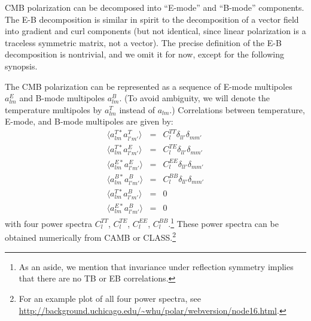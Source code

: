 \documentclass[aps,prd,superscriptaddress,groupedaddress,nofootinbib,nobibnotes]{revtex4}
\newcommand{\ba}{\begin{eqnarray}}
\newcommand{\ea}{\end{eqnarray}}
\begin{document}
CMB polarization can be decomposed into ``E-mode'' and ``B-mode'' components.
The E-B decomposition is similar in spirit to the decomposition of a vector field into gradient and curl 
components (but not identical, since linear polarization is a traceless symmetric matrix, not a vector).
The precise definition of the E-B decomposition is nontrivial, and we omit it for now, except for the following 
synopsis.

The CMB polarization can be represented as a sequence of E-mode multipoles $a_{lm}^E$ and B-mode multipoles $a_{lm}^B$.
(To avoid ambiguity, we will denote the temperature multipoles by $a_{lm}^T$ instead of $a_{lm}$.)
Correlations between temperature, E-mode, and B-mode multipoles are given by:
\ba
\langle a_{lm}^{T*} a_{l'm'}^T \rangle &=& C_l^{TT} \delta_{ll'} \delta_{mm'} \\
\langle a_{lm}^{T*} a_{l'm'}^E \rangle &=& C_l^{TE} \delta_{ll'} \delta_{mm'} \\
\langle a_{lm}^{E*} a_{l'm'}^E \rangle &=& C_l^{EE} \delta_{ll'} \delta_{mm'} \\
\langle a_{lm}^{B*} a_{l'm'}^B \rangle &=& C_l^{BB} \delta_{ll'} \delta_{mm'} \\
\langle a_{lm}^{T*} a_{l'm'}^B \rangle &=& 0  \\
\langle a_{lm}^{E*} a_{l'm'}^B \rangle &=& 0
\ea
with four power spectra $C_l^{TT}$, $C_l^{TE}$, $C_l^{EE}$, $C_l^{BB}$.\footnote{As an aside,
 we mention that invariance under reflection symmetry implies that there are no TB or EB correlations.}
These power spectra can be obtained numerically from CAMB or CLASS.\footnote{For an example plot of all four power spectra, see
 \url{http://background.uchicago.edu/~whu/polar/webversion/node16.html}.}
\end{document}
